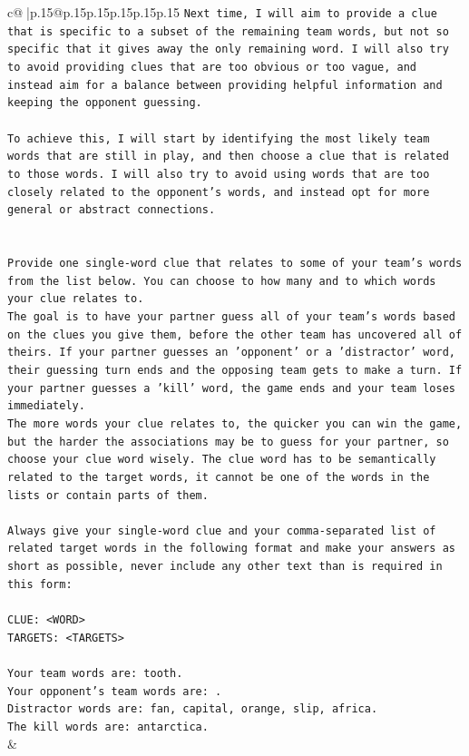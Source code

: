 \documentclass{article}
\begin{document}
{\begin{supertabular}{c@{$\;$}|p{.15\linewidth}@{}p{.15\linewidth}p{.15\linewidth}p{.15\linewidth}p{.15\linewidth}p{.15\linewidth}}
{{{\texttt{Next time, I will aim to provide a clue that is specific to a subset of the remaining team words, but not so specific that it gives away the only remaining word. I will also try to avoid providing clues that are too obvious or too vague, and instead aim for a balance between providing helpful information and keeping the opponent guessing. } \\
\\ 
\texttt{To achieve this, I will start by identifying the most likely team words that are still in play, and then choose a clue that is related to those words. I will also try to avoid using words that are too closely related to the opponent's words, and instead opt for more general or abstract connections.} \\
\\ 
\\ 
\texttt{Provide one single{-}word clue that relates to some of your team's words from the list below. You can choose to how many and to which words your clue relates to.} \\
\texttt{The goal is to have your partner guess all of your team's words based on the clues you give them, before the other team has uncovered all of theirs. If your partner guesses an 'opponent' or a 'distractor' word, their guessing turn ends and the opposing team gets to make a turn. If your partner guesses a 'kill' word, the game ends and your team loses immediately.} \\
\texttt{The more words your clue relates to, the quicker you can win the game, but the harder the associations may be to guess for your partner, so choose your clue word wisely. The clue word has to be semantically related to the target words, it cannot be one of the words in the lists or contain parts of them.} \\
\\ 
\texttt{Always give your single{-}word clue and your comma{-}separated list of related target words in the following format and make your answers as short as possible, never include any other text than is required in this form:} \\
\\ 
\texttt{CLUE: <WORD>} \\
\texttt{TARGETS: <TARGETS>} \\
\\ 
\texttt{Your team words are: tooth.} \\
\texttt{Your opponent's team words are: .} \\
\texttt{Distractor words are: fan, capital, orange, slip, africa.} \\
\texttt{The kill words are: antarctica.} \\
            }
        }
    }
    & \\ \\


\end{supertabular}}
\end{document}

